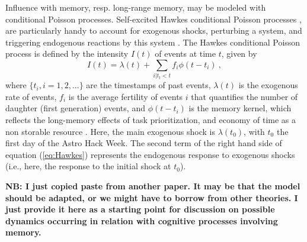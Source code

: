 Influence with memory, resp. long-range memory, may be modeled with conditional Poisson processes. Self-excited Hawkes conditional Poisson processes \cite{Hawkes_1974}, are particularly handy to account for exogenous shocks, perturbing a system, and triggering endogenous reactions by this system \cite{Crane_2008}. The Hawkes conditional Poisson process is defined by the intensity $I(t)$ of events at time $t$, given by
\begin{equation}
I(t)= \lambda(t) + \sum_{i | t_t<t}  f_i \phi(t-t_i)~,
\label{eq:Hawkes}
\end{equation}
where $\{t_i, i=1, 2, ...\}$ are the timestamps of past events, $\lambda(t)$ is the exogenous rate of events, $f_{i}$ is the average fertility of events $i$ that quantifies the number of daughter (first generation) events, and $ \phi(t-t_i)$ is the memory kernel, which reflects the long-memory effects of task prioritization, and economy of time as a non storable resource \cite{Maillart_2011}. Here, the main exogenous shock is $\lambda(t_{0})$, with $t_{0}$ the first day of the Astro Hack Week. The second term of the right hand side of equation (\ref{eq:Hawkes}) represents the endogenous response to exogenous shocks (i.e., here, the response to the initial shock at $t_{0}$). 

{\bf NB: I just copied paste from another paper. It may be that the model should be adapted, or we might have to borrow from other theories. I just provide it here as a starting point for discussion on possible dynamics occurring in relation with cognitive processes involving memory.}
  
  
  
  
  
  